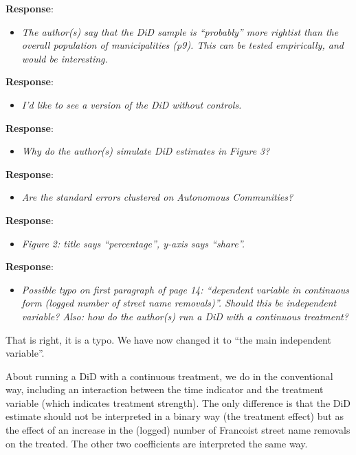 \documentclass[12pt, a4paper, notitlepage]{article}
\begin{document}
\textbf{Response}: {\color{red}{pending}}

\begin{itemize}
  \item \textit{The author(s) say that the DiD sample is “probably” more rightist than the overall
  population of municipalities (p9). This can be tested empirically, and would be
  interesting.}
\end{itemize}

\textbf{Response}: {\color{red}{pending}}

\begin{itemize}
  \item \textit{I’d like to see a version of the DiD without controls.}
\end{itemize}

\textbf{Response}: {\color{red}{pending}}

\begin{itemize}
  \item \textit{Why do the author(s) simulate DiD estimates in Figure 3?}
\end{itemize}

\textbf{Response}: {\color{red}{pending}}

\begin{itemize}
  \item \textit{Are the standard errors clustered on Autonomous Communities?}
\end{itemize}

\textbf{Response}: {\color{red}{pending}}

\begin{itemize}
  \item \textit{Figure 2: title says “percentage”, y-axis says “share”.}
\end{itemize}

\textbf{Response}: {\color{red}{pending}}

\begin{itemize}
  \item \textit{Possible typo on first paragraph of page 14: “dependent variable in continuous form
  (logged number of street name removals)”. Should this be independent variable? Also: how do the author(s) run a DiD with a continuous treatment?}
\end{itemize}

That is right, it is a typo. We have now changed it to ``the main independent variable''.

About running a DiD with a continuous treatment, we do in the conventional way, including an interaction between the time indicator and the treatment variable (which indicates treatment strength). The only difference is that the DiD estimate should not be interpreted in a binary way (the treatment effect) but as the effect of an increase in the (logged) number of Francoist street name removals on the treated. The other two coefficients are interpreted the same way.
\end{document}
